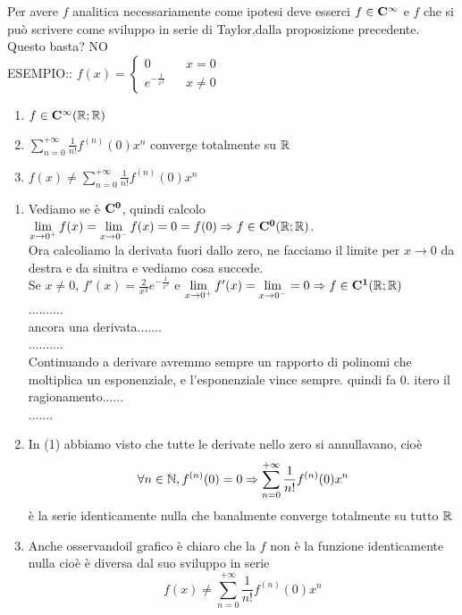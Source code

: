 Per avere $f$ analitica  necessariamente come ipotesi deve esserci $f\in \cntclass{\infty}$ e $f$ che si può scrivere come sviluppo in serie di Taylor,dalla proposizione precedente. Questo basta? NO\\
ESEMPIO:: $f(x)=\left\{\begin{matrix}0&& x=0\\e^{-\frac{1}{x^2}}&&x\ne 0\end{matrix}\right.$\\
\begin{center}
	\begin{tikzpicture}[scale=1]
	\end{tikzpicture}
\end{center}
\begin{enumerate}
	\item $f\in \cntclass{\infty}( \R; \R)$
	\item $\sum\limits_{n=0}^{+\infty}\frac{1}{n!}f^{(n)}(0)x^n$ converge totalmente su $ \R$
	\item $f(x)\ne\sum\limits_{n=0}^{+\infty}\frac{1}{n!}f^{(n)}(0)x^n$
\end{enumerate}
\begin{enumerate}
	\item Vediamo se è $\cntclass{0}$, quindi calcolo $\lim\limits_{x\to 0^{+}}f(x)=\lim\limits_{x\to 0^{-}}f(x)=0=f(0)\Rightarrow f\in \cntclass{0}( \R; \R)$.\\
	Ora calcoliamo la derivata fuori dallo zero, ne facciamo il limite per $x\to 0$ da destra e da sinitra e vediamo cosa succede.\\
	Se $x\ne 0$, $f'(x)=\frac{2}{x^3}e^{-\frac{1}{x^3}}$ e $\lim\limits_{x\to 0^{+}}f'(x)=\lim\limits_{x\to 0^{-}} = 0\Rightarrow f\in \cntclass{1}( \R; \R)$\\
	..........\\
	ancora una derivata.......\\
	..........\\
	Continuando a derivare  avremmo sempre un rapporto di polinomi che moltiplica un esponenziale, e l'esponenziale vince sempre. quindi fa $0$.
	itero il ragionamento......\\
	.......\\
	\item In (1) abbiamo visto  che tutte le derivate nello zero si annullavano, cioè
	\[\forall n\in\N, f^{(n)}(0)=0\Rightarrow \sum\limits_{n=0}^{+\infty}\frac{1}{n!}f^{(n)}(0)x^n\]
	è la serie identicamente nulla  che banalmente converge totalmente su tutto $ \R$
	\item Anche osservandoil grafico è chiaro che la $f$ non è la funzione identicamente nulla cioè è diversa dal suo sviluppo in serie
	\[f(x)\ne\sum\limits_{n=0}^{+\infty}\frac{1}{n!}f^{(n)}(0)x^n\]
\end{enumerate}
